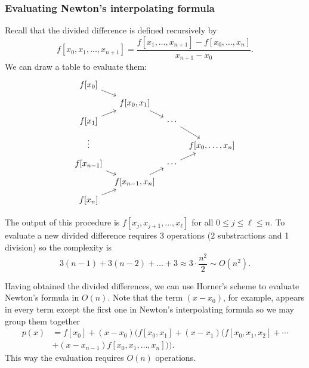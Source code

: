 \documentclass[a4paper]{article}
\begin{document}
\subsubsection{Evaluating Newton's interpolating formula}

Recall that the divided difference is defined recursively by
\[
  f[x_0, x_1, \dots, x_{n + 1}] = \frac{f[x_1, \dots, x_{n + 1}] - f[x_0, \dots, x_n]}{x_{n + 1} - x_0}.
\]
We can draw a table to evaluate them:
\[
  \begin{tikzcd}[column sep=tiny, row sep=tiny]
    f[x_0] \ar[dr] \\
    & f[x_0, x_1] \ar[dr] \\
    f[x_1] \ar[ur] & & \cdots \ar[dr] \\
    \vdots & & & f[x_0, \dots, x_n] \\
    f[x_{n - 1}] \ar[dr] & & \cdots \ar[ur] \\
    & f[x_{n - 1}, x_n] \ar[ur] \\
    f[x_n] \ar[ur]
  \end{tikzcd}
\]

The output of this procedure is \(f[x_j, x_{j + 1}, \dots, x_\ell]\) for all \(0 \leq j \leq \ell \leq n\). To evaluate a new divided difference requires 3 operations (2 substractions and 1 division) so the complexity is
\[
  3(n - 1) + 3(n - 2) + \dots + 3 \approx 3 \cdot \frac{n^2}{2} \sim O(n^2).
\]

Having obtained the divided differences, we can use Horner's scheme to evaluate Newton's formula in \(O(n)\). Note that the term \((x - x_0)\), for example, appears in every term except the first one in Newton's interpolating formula so we may group them together
\begin{align*}
  p(x) &= f[x_0] + (x - x_0) (f[x_0, x_1] + (x - x_1)(f[x_0, x_1, x_2] + \cdots \\
       &+ (x - x_{n - 1})f[x_0, x_1, \dots, x_n])).
\end{align*}
This way the evaluation requires \(O(n)\) operations.




\printindex

\iffalse
http://damtp.cam.ac.uk/user/hf323/L18-IB-NA/
\fi
\end{document}
